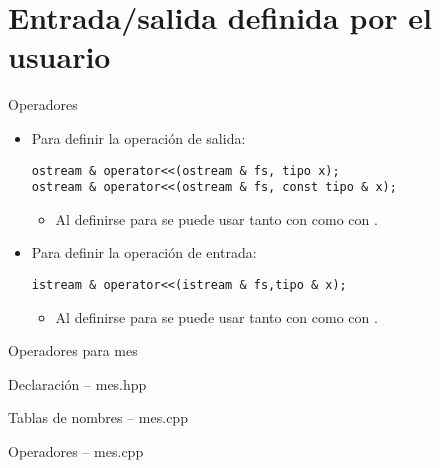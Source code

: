 \section{Entrada/salida definida por el usuario}

\begin{frame}[t,fragile]{Operadores}
\begin{itemize}
  \item Para definir la operación de salida:
\begin{lstlisting}
ostream & operator<<(ostream & fs, tipo x);
ostream & operator<<(ostream & fs, const tipo & x);
\end{lstlisting}
    \begin{itemize}
      \item Al definirse para  se puede usar
            tanto con  como con .
    \end{itemize}

  \item Para definir la operación de entrada:
\begin{lstlisting}
istream & operator<<(istream & fs,tipo & x);
\end{lstlisting}
    \begin{itemize}
      \item Al definirse para  se puede usar
            tanto con  como con .
    \end{itemize}
\end{itemize}
\end{frame}

\begin{frame}[t]{Operadores para mes}
\begin{block}{Declaración -- mes.hpp}

\end{block}
\begin{block}{Tablas de nombres -- mes.cpp}

\end{block}
\end{frame}

\begin{frame}[t]
\begin{block}{Operadores -- mes.cpp}
\mode<presentation>{

}
\end{block}
\end{frame}
